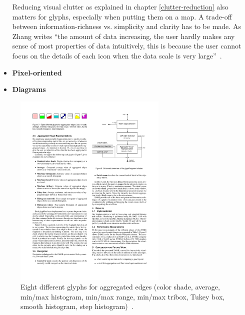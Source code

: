 \begin{itemize}
Reducing visual clutter as explained in chapter \ref{clutter-reduction} also matters for glyphs, especially when putting them on a map. A trade-off between information-richness vs. simplicity and clarity has to be made. As Zhang writes ``the amount of data increasing, the user hardly makes any sense of most properties of data intuitively, this is because the user cannot focus on the details of each icon when the data scale is very large''~\cite{zhang07thesis}.

\item \textbf{Pixel-oriented}

\item \textbf{Diagrams}

\end{itemize}



\begin{figure}[h]
  \begin{center}
    \includegraphics[width=0.65\textwidth]{figures/glyphs_zame.pdf}
    \caption{Eight different glyphs for aggregated edges (color shade,
average, min/max histogram, min/max range, min/max tribox, Tukey
box, smooth histogram, step histogram)~\cite{ElmqvistDGHF08}.}
    \label{fig:glyphs-zame}
  \end{center}
\end{figure}









